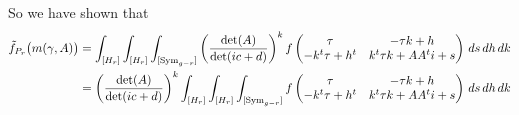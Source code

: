 So we have shown that 
\begin{align*}
    \tilde f_{P_r}\bigl(m(\gamma, A)\bigr) &= \int^{}_{[H_r]}\int^{}_{[H_r]}\int^{}_{[\mathrm{Sym}_{g-r}]}  \left(\frac{\det(A)}{\det(ic + d)}\right)^{k} f\begin{pmatrix} \tau & -\tau k + h\\ -k^t \tau + h^t & k^t \tau k + A A^t i + s \end{pmatrix}   \,ds\,dh\,dk\\
     &= \left(\frac{\det(A)}{\det(ic + d)}\right)^{k} \int^{}_{[H_r]}\int^{}_{[H_r]}\int^{}_{[\mathrm{Sym}_{g-r}]}  f\begin{pmatrix} \tau & -\tau k + h\\ -k^t \tau + h^t & k^t \tau k + A A^t i + s \end{pmatrix}   \,ds\,dh\,dk\\
\end{align*}

